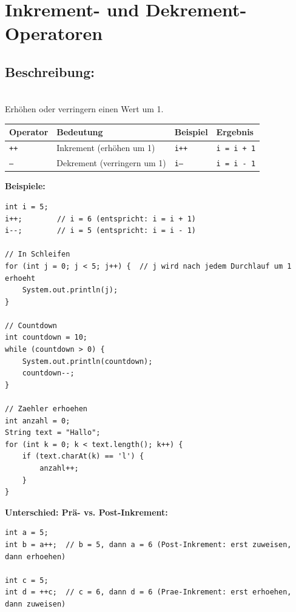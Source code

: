 \newpage


\section*{Inkrement- und Dekrement-Operatoren}

\subsection*{Beschreibung:}\\
Erhöhen oder verringern einen Wert um 1.

\begin{center}
\begin{tabular}{|l|l|l|l|}
\hline
\textbf{Operator} & \textbf{Bedeutung} & \textbf{Beispiel} & \textbf{Ergebnis} \\
\hline
\texttt{++} & Inkrement (erhöhen um 1) & \texttt{i++} & \texttt{i = i + 1} \\
\hline
\texttt{--} & Dekrement (verringern um 1) & \texttt{i--} & \texttt{i = i - 1} \\
\hline
\end{tabular}
\end{center}

\textbf{Beispiele:}
\begin{lstlisting}
int i = 5;
i++;        // i = 6 (entspricht: i = i + 1)
i--;        // i = 5 (entspricht: i = i - 1)

// In Schleifen
for (int j = 0; j < 5; j++) {  // j wird nach jedem Durchlauf um 1 erhoeht
    System.out.println(j);
}

// Countdown
int countdown = 10;
while (countdown > 0) {
    System.out.println(countdown);
    countdown--;
}

// Zaehler erhoehen
int anzahl = 0;
String text = "Hallo";
for (int k = 0; k < text.length(); k++) {
    if (text.charAt(k) == 'l') {
        anzahl++;
    }
}
\end{lstlisting}

\textbf{Unterschied: Prä- vs. Post-Inkrement:}
\begin{lstlisting}
int a = 5;
int b = a++;  // b = 5, dann a = 6 (Post-Inkrement: erst zuweisen, dann erhoehen)

int c = 5;
int d = ++c;  // c = 6, dann d = 6 (Prae-Inkrement: erst erhoehen, dann zuweisen)
\end{lstlisting}


